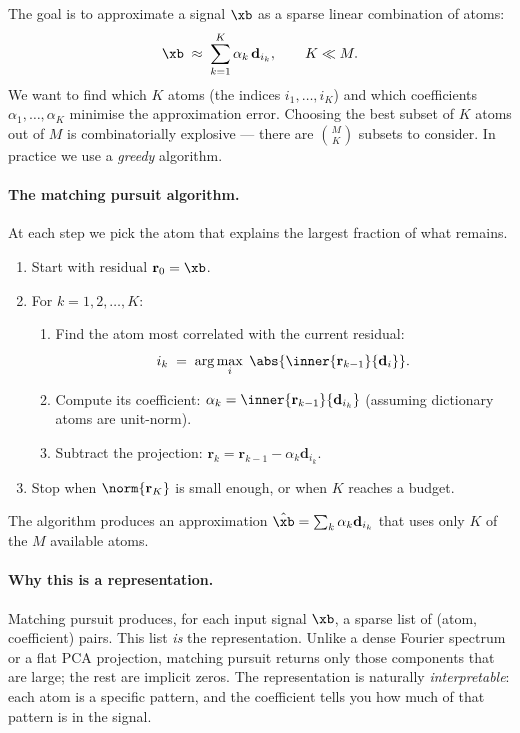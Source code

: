 The goal is to approximate a signal $\xb$ as a sparse linear combination
of atoms:
\begin{equation}
    \xb \;\approx\; \sum_{k=1}^{K} \alpha_k\, \mathbf{d}_{i_k},
    \qquad
    K \ll M.
\end{equation}
We want to find which $K$ atoms (the indices $i_1, \ldots, i_K$) and
which coefficients $\alpha_1, \ldots, \alpha_K$ minimise the
approximation error.  Choosing the best subset of $K$ atoms out of $M$
is combinatorially explosive --- there are $\binom{M}{K}$ subsets to
consider.  In practice we use a \emph{greedy} algorithm.

\paragraph{The matching pursuit algorithm.}  At each step we pick the
atom that explains the largest fraction of what remains.

\begin{enumerate}
    \item Start with residual $\mathbf{r}_0 = \xb$.
    \item For $k = 1, 2, \ldots, K$:
    \begin{enumerate}
        \item Find the atom most correlated with the current residual:
        \[
            i_k \;=\; \arg\max_i \; \abs{\inner{\mathbf{r}_{k-1}}{\mathbf{d}_i}}.
        \]
        \item Compute its coefficient: $\alpha_k = \inner{\mathbf{r}_{k-1}}{\mathbf{d}_{i_k}}$
        (assuming dictionary atoms are unit-norm).
        \item Subtract the projection: $\mathbf{r}_k = \mathbf{r}_{k-1}
        - \alpha_k \mathbf{d}_{i_k}$.
    \end{enumerate}
    \item Stop when $\norm{\mathbf{r}_K}$ is small enough, or when $K$
    reaches a budget.
\end{enumerate}

\noindent The algorithm produces an approximation $\hat\xb = \sum_k
\alpha_k \mathbf{d}_{i_k}$ that uses only $K$ of the $M$ available
atoms.

\paragraph{Why this is a representation.}  Matching pursuit produces,
for each input signal $\xb$, a sparse list of (atom, coefficient) pairs.
This list \emph{is} the representation.  Unlike a dense Fourier
spectrum or a flat PCA projection, matching pursuit returns only
those components that are large; the rest are implicit zeros.  The
representation is naturally \emph{interpretable}: each atom is a
specific pattern, and the coefficient tells you how much of that
pattern is in the signal.

